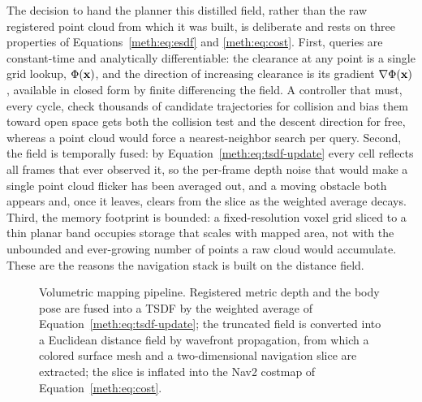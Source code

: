 The decision to hand the planner this distilled field, rather than the raw registered point cloud from which it was built, is deliberate and rests on three properties of Equations~\eqref{meth:eq:esdf} and \eqref{meth:eq:cost}. First, queries are constant-time and analytically differentiable: the clearance at any point is a single grid lookup, $\Phi(\mathbf{x})$, and the direction of increasing clearance is its gradient $\nabla\Phi(\mathbf{x})$, available in closed form by finite differencing the field. A controller that must, every cycle, check thousands of candidate trajectories for collision and bias them toward open space gets both the collision test and the descent direction for free, whereas a point cloud would force a nearest-neighbor search per query. Second, the field is temporally fused: by Equation~\eqref{meth:eq:tsdf-update} every cell reflects all frames that ever observed it, so the per-frame depth noise that would make a single point cloud flicker has been averaged out, and a moving obstacle both appears and, once it leaves, clears from the slice as the weighted average decays. Third, the memory footprint is bounded: a fixed-resolution voxel grid sliced to a thin planar band occupies storage that scales with mapped area, not with the unbounded and ever-growing number of points a raw cloud would accumulate. These are the reasons the navigation stack is built on the distance field.

\begin{figure}[!htb]
  \centering
  \caption{Volumetric mapping pipeline. Registered metric depth and the body pose are fused into a TSDF by the weighted average of Equation~\eqref{meth:eq:tsdf-update}; the truncated field is converted into a Euclidean distance field by wavefront propagation, from which a colored surface mesh and a two-dimensional navigation slice are extracted; the slice is inflated into the Nav2 costmap of Equation~\eqref{meth:eq:cost}.}
  \label{meth:fig:nvbloxpipe}
\end{figure}

